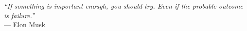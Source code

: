 \cleardoublepage
{}
\thispagestyle{empty}

\vspace*{3cm}

\begin{center}{
    \slshape
    ``If something is important enough, you should try. Even if the probable outcome is failure.''} \\
    \medskip
    --- Elon Musk
\end{center}

\medskip
